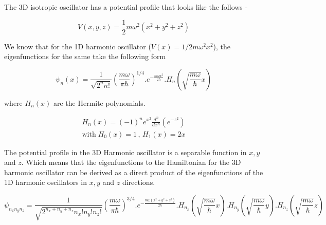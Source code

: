 \setcounter{draft}{1}
\newcommand{\unitvectorn}{\hat{\textbf{n}}}
\newcommand{\sigmavector}{\boldsymbol{\sigma}}







    The 3D isotropic oscillator has a potential profile that looks like the follows - 

    \begin{equation*}
        V(x,y,z) = \frac{1}{2}m\omega^2(x^2 + y^2 + z^2)
    \end{equation*}

    We know that for the 1D harmonic oscillator ($V(x) = 1/2 m\omega^2x^2$), the eigenfunctions for the same take the following form

    \begin{equation*}
        \psi_n(x) = \frac{1}{\sqrt{2^nn!}} \left( \frac{m\omega}{\pi\hbar} \right)^{1/4} . e^{-\frac{m\omega x^2}{2\hbar}} . H_n \left( \sqrt{\frac{m\omega}{\hbar}} x \right)
    \end{equation*}

    where $H_n(x)$ are the Hermite polynomials.

    \begin{gather*}
        H_n(x) = (-1)^n e^{x^2} \frac{d^n}{dx^n} (e^{-z^2}) \\
        \text{with} \; H_0(x) = 1 \, , \, H_1(x) = 2x
    \end{gather*}

    The potential profile in the 3D Harmonic oscillator is a separable function in $x,y$ and $z$. Which means that the eigenfunctions to the Hamiltonian for the 3D harmonic oscillator can be derived as a direct product of the eigenfunctions of the 1D harmonic oscillators in $x,y$ and $z$ directions.

    \begin{equation*}
        \psi_{n_xn_yn_z} = \frac{1}{\sqrt{2^{n_x + n_y + n_z} n_x! n_y! n_z!}} \left( \frac{m\omega}{\pi\hbar} \right)^{3/4} . e^{-\frac{m\omega (x^2 + y^2 + z^2)}{2\hbar}} . H_{n_x} \left( \sqrt{\frac{m\omega}{\hbar}} x \right) . H_{n_y} \left( \sqrt{\frac{m\omega}{\hbar}} y \right) . H_{n_z} \left( \sqrt{\frac{m\omega}{\hbar}} z \right)
    \end{equation*}

